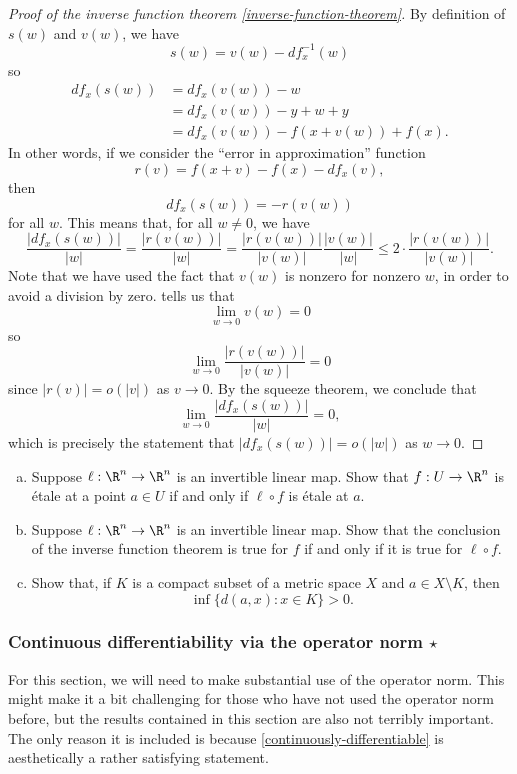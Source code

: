 \begin{proof}[Proof of the inverse function theorem \ref{inverse-function-theorem}]
	By definition of $s(w)$ and $v(w)$, we have
	\[ s(w) = v(w) - df_x^{-1}(w) \]
	so
	\[ \begin{aligned} df_x(s(w)) &= df_x(v(w)) - w \\
	&= df_x(v(w)) - y + w + y \\
	&= df_x(v(w)) - f(x+v(w)) + f(x). \end{aligned} \]
	In other words, if we consider the ``error in approximation'' function
	\[ r(v) = f(x+v) - f(x) - df_x(v), \]
	then
	\[ df_x(s(w)) = -r(v(w)) \]
	for all $w$. This means that, for all $w \neq 0$, we have
	\[ \frac{|df_x(s(w))|}{|w|} = \frac{|r(v(w))|}{|w|} = \frac{|r(v(w))|}{|v(w)|} \frac{|v(w)|}{|w|} \leq 2 \cdot \frac{|r(v(w))|}{|v(w)|}. \]
	Note that we have used the fact that $v(w)$ is nonzero for nonzero $w$, in order to avoid a division by zero.  tells us that
	\[ \lim_{w \to 0} v(w) = 0 \]
	so
	\[ \lim_{w \to 0} \frac{|r(v(w))|}{|v(w)|} = 0 \]
	since $|r(v)| = o(|v|)$ as $v \to 0$. By the squeeze theorem, we conclude that 
	\[ \lim_{w \to 0} \frac{|df_x(s(w))|}{|w|} = 0, \]
	which is precisely the statement that $|df_x(s(w))| = o(|w|)$ as $w \to  0$. 
\end{proof}

\begin{exercise} \label{inverse-function-theorem-details}
	\begin{enumerate}[(a)]
		\item Suppose $\ell : \R^n \to \R^n$ is an invertible linear map. Show that $f : U \to \R^n$ is \'etale at a point $a \in U$ if and only if $\ell \circ f$ is \'etale at $a$. 
		\item Suppose $\ell : \R^n \to \R^n$ is an invertible linear map. Show that the conclusion of the inverse function theorem is true for $f$ if and only if it is true for $\ell \circ f$. 
		\item \label{compact-distance-inf} Show that, if $K$ is a compact subset of a metric space $X$ and $a \in X \setminus K$, then 
		\[ \inf\{ d(a,x) : x \in K \} > 0. \]
	\end{enumerate}
\end{exercise}

\subsubsection*{Continuous differentiability via the operator norm \texorpdfstring{$\star$}{*}}

For this section, we will need to make substantial use of the operator norm. This might make it a bit challenging for those who have not used the operator norm before, but the results contained in this section are also not terribly important. The only reason it is included is because \cref{continuously-differentiable} is aesthetically a rather satisfying statement. 

